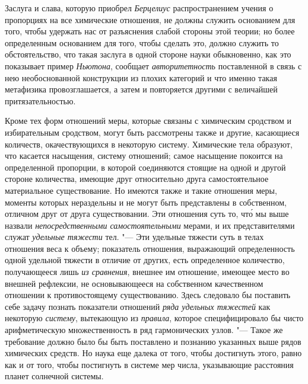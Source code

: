 Заслуга и слава, которую приобрел {\em Берцелиус} распространением учения о
пропорциях на все химические отношения, не должны служить основанием для того,
чтобы удержать нас от разъяснения слабой стороны этой теории; но более
определенным основанием для того, чтобы сделать это, должно служить то
обстоятельство, что такая заслуга в одной стороне науки обыкновенно, как это
показывает пример {\em Ньютона}, сообщает {\em авторитетность} поставленной в
связь с нею необоснованной конструкции из плохих категорий и что именно такая
метафизика провозглашается, а затем и повторяется другими с величайшей
притязательностью.

Кроме тех форм отношений меры, которые связаны с химическим сродством и
избирательным сродством, могут быть рассмотрены также и другие, касающиеся
количеств, окачествующихся в некоторую систему. Химические тела образуют, что
касается насыщения, систему отношений; самое насыщение покоится на определенной
пропорции, в которой соединяются стоящие на одной и другой стороне количества,
имеющие друг относительно друга самостоятельное материальное существование. Но
имеются также и такие отношения меры, моменты которых нераздельны и не могут
быть представлены в собственном, отличном друг от друга существовании. Эти
отношения суть то, чт\'{о} мы выше назвали
{\em непосредственными самостоятельными} мерами, и их представителями служат
{\em удельные тяжести} тел. "--- Эти удельные тяжести суть в телах отношения
веса к объему; показатель отношения, выражающий определенность одной удельной
тяжести в отличие от других, есть определенное количество, получающееся лишь
{\em из сравнения}, внешнее им отношение, имеющее место во внешней рефлексии,
не основывающееся на собственном качественном отношении к противостоящему
существованию. Здесь следовало бы поставить себе задачу познать показатели
отношений {\em ряда удельных тяжестей} как некоторую {\em систему}, вытекающую
из {\em правила}, которое специфицировало бы чисто арифметическую
множественность в ряд гармонических узлов. "--- Такое же требование должно было
бы быть поставлено и познанию указанных выше рядов химических средств. Но наука
еще далека от того, чтобы достигнуть этого, равно как и от того, чтобы
постигнуть в системе мер числа, указывающие расстояния планет солнечной
системы.

